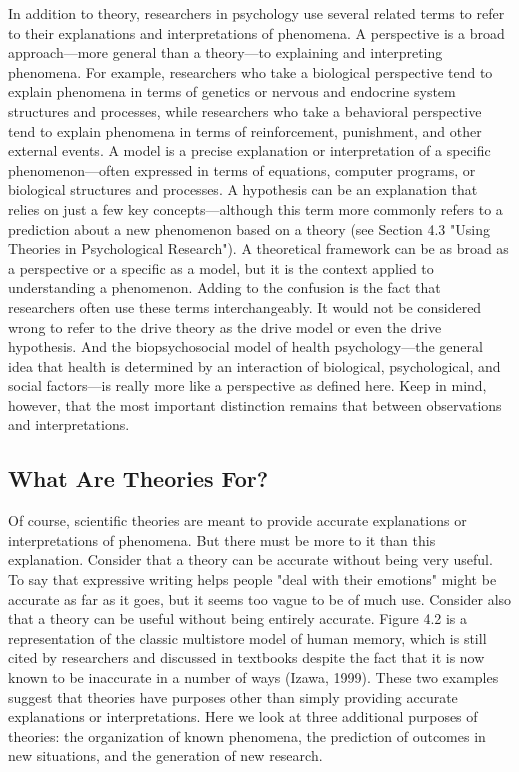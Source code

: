  In addition to theory, researchers in psychology use several related terms to refer to their explanations and interpretations of phenomena. A perspective is a broad approach---more general than a theory---to explaining and interpreting phenomena. For example, researchers who take a biological perspective tend to explain phenomena in terms of genetics or nervous and endocrine system structures and processes, while researchers who take a behavioral perspective tend to explain phenomena in terms of reinforcement, punishment, and other external events. A model is a precise explanation or interpretation of a specific phenomenon---often expressed in terms of equations, computer programs, or biological structures and processes. A hypothesis can be an explanation that relies on just a few key concepts---although this term more commonly refers to a prediction about a new phenomenon based on a theory (see Section 4.3 "Using Theories in Psychological Research"). A theoretical framework can be as broad as a perspective or a specific as a model, but it is the context applied to understanding a phenomenon. Adding to the confusion is the fact that researchers often use these terms interchangeably. It would not be considered wrong to refer to the drive theory as the drive model or even the drive hypothesis. And the biopsychosocial model of health psychology---the general idea that health is determined by an interaction of biological, psychological, and social factors---is really more like a perspective as defined here. Keep in mind, however, that the most important distinction remains that between observations and interpretations.
 
 \subsection{What Are Theories For?}
 
 
Of course, scientific theories are meant to provide accurate explanations or interpretations of phenomena. But there must be more to it than this explanation. Consider that a theory can be accurate without being very useful. To say that expressive writing helps people "deal with their emotions" might be accurate as far as it goes, but it seems too vague to be of much use. Consider also that a theory can be useful without being entirely accurate. Figure 4.2 is a representation of the classic multistore model of human memory, which is still cited by researchers and discussed in textbooks despite the fact that it is now known to be inaccurate in a number of ways (Izawa, 1999). These two examples suggest that theories have purposes other than simply providing accurate explanations or interpretations. Here we look at three additional purposes of theories: the organization of known phenomena, the prediction of outcomes in new situations, and the generation of new research.
 
